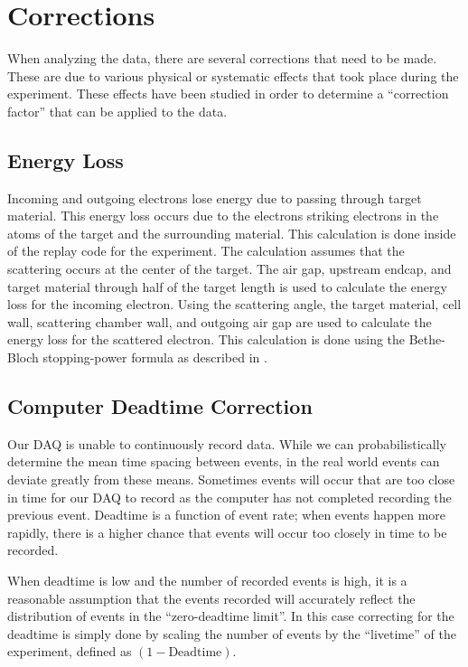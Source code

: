 \section{Corrections}

When analyzing the data, there are several corrections that need to be made. These are due to various physical or systematic effects that took place during the experiment. These effects have been studied in order to determine a ``correction factor'' that can be applied to the data.

\subsection{Energy Loss}

Incoming and outgoing electrons lose energy due to passing through target material. This energy loss occurs due to the electrons striking electrons in the atoms of the target and the surrounding material. This calculation is done inside of the replay code for the experiment. The calculation assumes that the scattering occurs at the center of the target. The air gap, upstream endcap, and target material through half of the target length is used to calculate the energy loss for the incoming electron. Using the scattering angle, the target material, cell wall, scattering chamber wall, and outgoing air gap are used to calculate the energy loss for the scattered electron. This calculation is done using the Bethe-Bloch stopping-power formula as described in \cite{eloss}.

\subsection{Computer Deadtime Correction}

Our DAQ is unable to continuously record data. While we can probabilistically determine the mean time spacing between events, in the real world events can deviate greatly from these means. Sometimes events will occur that are too close in time for our DAQ to record as the computer has not completed recording the previous event. Deadtime is a function of event rate; when events happen more rapidly, there is a higher chance that events will occur too closely in time to be recorded.

When deadtime is low and the number of recorded events is high, it is a reasonable assumption that the events recorded will accurately reflect the distribution of events in the ``zero-deadtime limit''. In this case correcting for the deadtime is simply done by scaling the number of events by the ``livetime'' of the experiment, defined as $\left(1-\text{Deadtime}\right)$.

